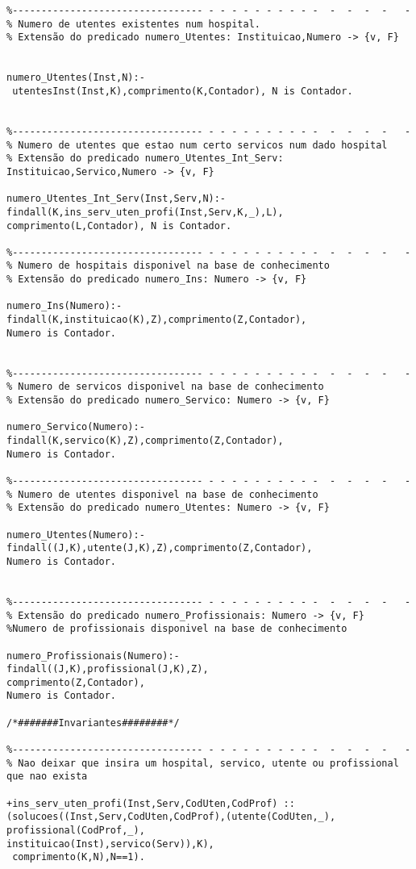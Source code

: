 \documentclass[pdftex,12pt,a4paper]{report}
\begin{document}
\begin{appendices}
\begin{Verbatim}
%--------------------------------- - - - - - - - - - -  -  -  -  -   -
% Numero de utentes existentes num hospital.
% Extensão do predicado numero_Utentes: Instituicao,Numero -> {v, F}


numero_Utentes(Inst,N):-
 utentesInst(Inst,K),comprimento(K,Contador), N is Contador.


%--------------------------------- - - - - - - - - - -  -  -  -  -   -
% Numero de utentes que estao num certo servicos num dado hospital
% Extensão do predicado numero_Utentes_Int_Serv: Instituicao,Servico,Numero -> {v, F}

numero_Utentes_Int_Serv(Inst,Serv,N):-
findall(K,ins_serv_uten_profi(Inst,Serv,K,_),L),
comprimento(L,Contador), N is Contador.

%--------------------------------- - - - - - - - - - -  -  -  -  -   -
% Numero de hospitais disponivel na base de conhecimento
% Extensão do predicado numero_Ins: Numero -> {v, F}

numero_Ins(Numero):-
findall(K,instituicao(K),Z),comprimento(Z,Contador),
Numero is Contador. 


%--------------------------------- - - - - - - - - - -  -  -  -  -   -
% Numero de servicos disponivel na base de conhecimento
% Extensão do predicado numero_Servico: Numero -> {v, F}

numero_Servico(Numero):-
findall(K,servico(K),Z),comprimento(Z,Contador),
Numero is Contador. 

%--------------------------------- - - - - - - - - - -  -  -  -  -   -
% Numero de utentes disponivel na base de conhecimento
% Extensão do predicado numero_Utentes: Numero -> {v, F}

numero_Utentes(Numero):-
findall((J,K),utente(J,K),Z),comprimento(Z,Contador),
Numero is Contador. 


%--------------------------------- - - - - - - - - - -  -  -  -  -   -
% Extensão do predicado numero_Profissionais: Numero -> {v, F}
%Numero de profissionais disponivel na base de conhecimento

numero_Profissionais(Numero):-
findall((J,K),profissional(J,K),Z),
comprimento(Z,Contador),
Numero is Contador. 

/*#######Invariantes########*/ 

%--------------------------------- - - - - - - - - - -  -  -  -  -   -
% Nao deixar que insira um hospital, servico, utente ou profissional que nao exista

+ins_serv_uten_profi(Inst,Serv,CodUten,CodProf) :: 
(solucoes((Inst,Serv,CodUten,CodProf),(utente(CodUten,_),
profissional(CodProf,_),
instituicao(Inst),servico(Serv)),K),
 comprimento(K,N),N==1).


\end{Verbatim}
\end{appendices}
\end{document}
